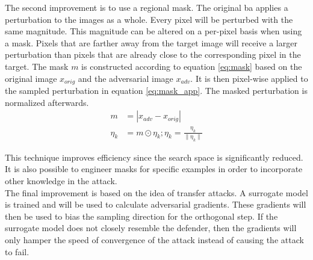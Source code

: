 The second improvement is to use a regional mask. The original \gls{ba} applies a perturbation to the images as a whole. Every pixel will be perturbed with the same magnitude. This magnitude can be altered on a per-pixel basis when using a mask. Pixels that are farther away from the target image will receive a larger perturbation than pixels that are already close to the corresponding pixel in the target. The mask $m$ is constructed according to equation \ref{eq:mask} based on the original image $x_{orig}$ and the adversarial image $x_{adv}$. It is then pixel-wise applied to the sampled perturbation in equation \ref{eq:mask_app}. The masked perturbation is normalized afterwards.\\ 

\begin{align}
m &= | x_{adv} - x_{orig}| \label{eq:mask}\\
\eta_{k} &= m \odot \eta_k; \eta_k = \frac{\eta_k}{\| \eta_k \|} \label{eq:mask_app}
\end{align}

This technique improves efficiency since the search space is significantly reduced. It is also possible to engineer masks for specific examples in order to incorporate other knowledge in the attack.\\

The final improvement is based on the idea of transfer attacks. A surrogate model is trained and will be used to calculate adversarial gradients. These gradients will then be used to bias the sampling direction for the orthogonal step. If the surrogate model does not closely resemble the defender, then the gradients will only hamper the speed of convergence of the attack instead of causing the attack to fail.

